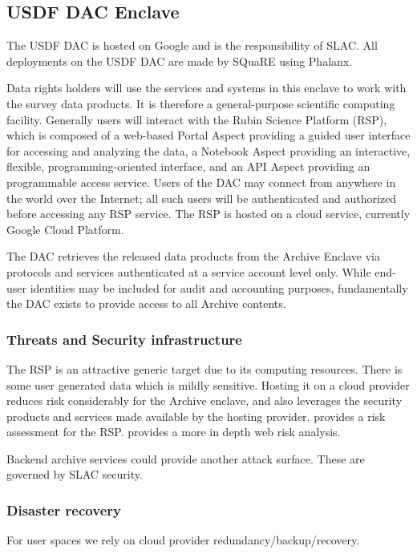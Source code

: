 \subsection{ USDF \gls{DAC} Enclave}
The USDF DAC is hosted on Google and  is the responsibility of SLAC.
All deployments on the USDF DAC are made by SQuaRE using Phalanx.

Data rights holders will use the services and systems in this enclave to work with the survey data products.
It is therefore a general-purpose scientific computing facility. Generally users will interact with the Rubin Science Platform (\gls{RSP}), which is composed of a web-based Portal Aspect providing a guided user interface for accessing and analyzing the data, a Notebook Aspect providing an interactive, flexible, programming-oriented interface, and an API Aspect providing an programmable access service.
Users of the DAC may connect from anywhere in the world over the Internet; all such users will be authenticated and authorized before accessing any \gls{RSP} service.
The \gls{RSP} is hosted on a cloud service, currently  Google Cloud Platform.

The DAC retrieves the released data products from the \gls{Archive} Enclave via protocols and services authenticated at a service account level only. While end-user identities may be included for audit and accounting purposes, fundamentally the DAC exists to provide access to all \gls{Archive} contents.

\subsubsection{ Threats and Security infrastructure}
The \gls{RSP} is  an attractive generic target due to its computing resources.
There is some user generated data which is mildly sensitive.
Hosting it on a cloud provider reduces risk considerably for the Archive enclave, and also leverages the security products and services made available by the hosting provider.
 provides a risk assessment for the \gls{RSP}.
 provides a more in depth web risk analysis.

Backend archive services could provide another attack surface.
These are governed by \gls{SLAC} security.

\subsubsection{Disaster recovery}
For user  spaces we rely on cloud provider redundancy/backup/recovery.

